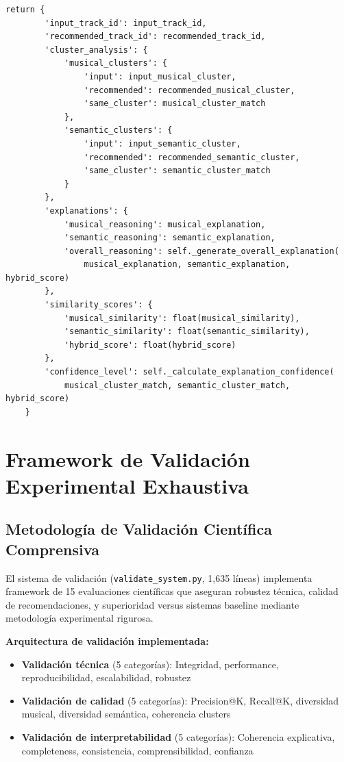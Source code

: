 \documentclass[12pt,a4paper]{report}
\begin{document}
\begin{lstlisting}[caption={Generación Automática de Explicaciones Comprensivas}]
    return {
        'input_track_id': input_track_id,
        'recommended_track_id': recommended_track_id,
        'cluster_analysis': {
            'musical_clusters': {
                'input': input_musical_cluster,
                'recommended': recommended_musical_cluster,
                'same_cluster': musical_cluster_match
            },
            'semantic_clusters': {
                'input': input_semantic_cluster,
                'recommended': recommended_semantic_cluster,
                'same_cluster': semantic_cluster_match
            }
        },
        'explanations': {
            'musical_reasoning': musical_explanation,
            'semantic_reasoning': semantic_explanation,
            'overall_reasoning': self._generate_overall_explanation(
                musical_explanation, semantic_explanation, hybrid_score)
        },
        'similarity_scores': {
            'musical_similarity': float(musical_similarity),
            'semantic_similarity': float(semantic_similarity),
            'hybrid_score': float(hybrid_score)
        },
        'confidence_level': self._calculate_explanation_confidence(
            musical_cluster_match, semantic_cluster_match, hybrid_score)
    }
\end{lstlisting}

\section{Framework de Validación Experimental Exhaustiva}

\subsection{Metodología de Validación Científica Comprensiva}

El sistema de validación (\texttt{validate\_system.py}, 1,635 líneas) implementa framework de 15 evaluaciones científicas que aseguran robustez técnica, calidad de recomendaciones, y superioridad versus sistemas baseline mediante metodología experimental rigurosa.

\textbf{Arquitectura de validación implementada:}
\begin{itemize}
    \item \textbf{Validación técnica} (5 categorías): Integridad, performance, reproducibilidad, escalabilidad, robustez
    \item \textbf{Validación de calidad} (5 categorías): Precision@K, Recall@K, diversidad musical, diversidad semántica, coherencia clusters
    \item \textbf{Validación de interpretabilidad} (5 categorías): Coherencia explicativa, completeness, consistencia, comprensibilidad, confianza
\end{itemize}
\end{document}
